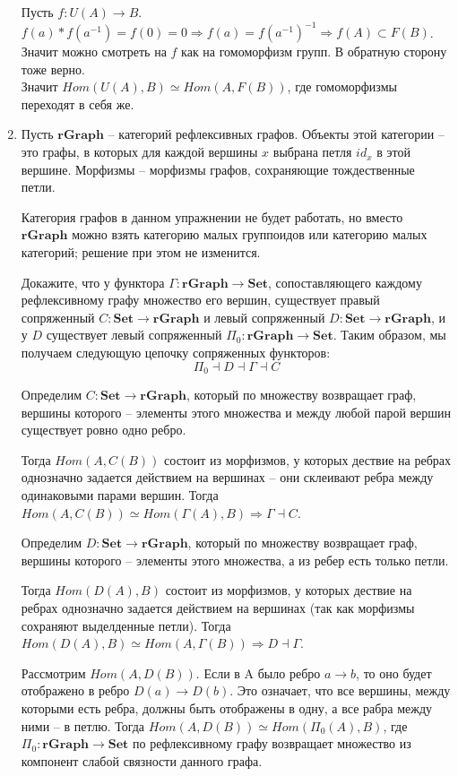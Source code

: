 \documentclass[draft]{article}
\newcommand{\cat}[1]{\mathbf{#1}}
\newcommand{\Set}{\cat{Set}}
\begin{document}
\begin{enumerate}
Пусть $f: U(A) \to B$. $f(a) * f(a^{-1}) = f(0) = 0 \Rightarrow f(a) = f(a^{-1})^{-1} \Rightarrow f(A) \subset F(B)$. Значит можно смотреть на $f$ как на гомоморфизм групп. В обратную сторону тоже верно. \\
Значит $Hom(U(A), B) \simeq Hom(A, F(B))$, где гомоморфизмы переходят в себя же.


\item Пусть $\cat{rGraph}$ -- категорий рефлексивных графов.
Объекты этой категории -- это графы, в которых для каждой вершины $x$ выбрана петля $id_x$ в этой вершине.
Морфизмы -- морфизмы графов, сохраняющие тождественные петли.

Категория графов в данном упражнении не будет работать, но вместо $\cat{rGraph}$ можно взять категорию малых группоидов или категорию малых категорий; решение при этом не изменится.

Докажите, что у функтора $\Gamma : \cat{rGraph} \to \Set$, сопоставляющего каждому рефлексивному графу множество его вершин, существует правый сопряженный $C : \Set \to \cat{rGraph}$ и левый сопряженный $D : \Set \to \cat{rGraph}$,
и у $D$ существует левый сопряженный $\Pi_0 : \cat{rGraph} \to \Set$.
Таким образом, мы получаем следующую цепочку сопряженных функторов:
\[ \Pi_0 \dashv D \dashv \Gamma \dashv C \]

Определим $C : \Set \to \cat{rGraph}$, который по множеству возвращает граф, вершины которого -- элементы этого множества и между любой парой вершин существует ровно одно ребро.

Тогда $Hom(A, C(B))$ состоит из морфизмов, у которых дествие на ребрах однозначно задается действием на вершинах -- они склеивают ребра между одинаковыми парами вершин. Тогда \\ $Hom(A, C(B)) \simeq Hom(\Gamma(A), B) \Rightarrow \Gamma \dashv C$. 

Определим $D : \Set \to \cat{rGraph}$, который по множеству возвращает граф, вершины которого -- элементы этого множества, а из ребер есть только петли.

Тогда $Hom(D(A), B)$ состоит из морфизмов, у которых дествие на ребрах однозначно задается действием на вершинах (так как морфизмы сохраняют выделденные петли). Тогда \\ $Hom(D(A), B) \simeq Hom(A, \Gamma(B)) \Rightarrow D \dashv \Gamma $. 

Рассмотрим $Hom(A, D(B))$. Если в A было ребро $a \to b$, то оно будет отображено в ребро $D(a) \to D(b)$. Это означает, что все вершины, между которыми есть ребра, должны быть отображены в одну, а все рабра между ними -- в петлю. Тогда $Hom(A, D(B)) \simeq Hom(\Pi_0(A), B)$, где $\Pi_0 : \cat{rGraph} \to \Set$ по рефлексивному графу возвращает множество из компонент слабой связности данного графа.



\end{enumerate}
\end{document}
